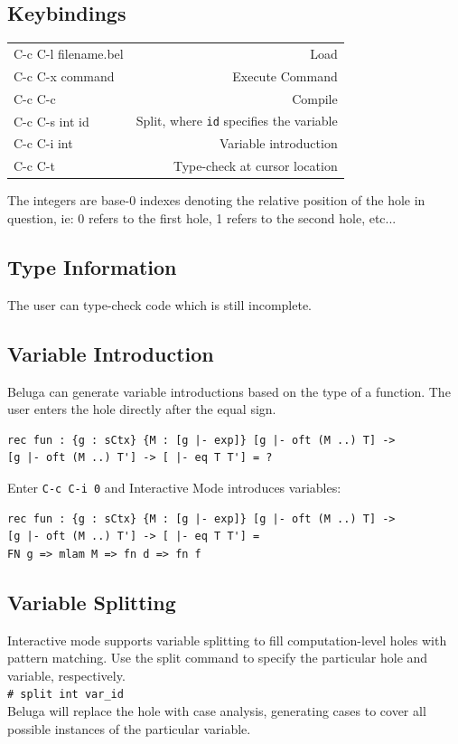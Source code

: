 \documentclass[11pt]{article}
\newcommand{\shellcmd}[1]{\\\indent\texttt{\# #1}\\}
\begin{document}
\subsection{Keybindings}

\begin{tabular}{ l r }
C-c C-l filename.bel & Load \\
C-c C-x command & Execute Command \\
C-c C-c & Compile \\
C-c C-s int id & Split, where \texttt{id} specifies the variable \\
C-c C-i int & Variable introduction \\
C-c C-t & Type-check at cursor location \\
\end{tabular}

The integers are base-0 indexes denoting the relative position of the hole in question, ie: 0 refers to the first hole, 1 refers to the second hole, etc... 
\subsection{Type Information}
The user can type-check code which is still incomplete. 

\subsection{Variable Introduction}
Beluga can generate variable introductions based on the type of a function. The user enters the hole directly after the equal sign. 
\begin{verbatim}
rec fun : {g : sCtx} {M : [g |- exp]} [g |- oft (M ..) T] -> 
[g |- oft (M ..) T'] -> [ |- eq T T'] = ?
\end{verbatim}

Enter \texttt{C-c C-i 0} and Interactive Mode introduces variables:
\begin{verbatim}
rec fun : {g : sCtx} {M : [g |- exp]} [g |- oft (M ..) T] -> 
[g |- oft (M ..) T'] -> [ |- eq T T'] =
FN g => mlam M => fn d => fn f
\end{verbatim}


\subsection{Variable Splitting}
Interactive mode supports variable splitting to fill computation-level holes with pattern matching. Use the split command to specify the particular hole and variable, respectively.
\shellcmd{split int var\_id}
 Beluga will replace the hole with case analysis, generating cases to cover all possible instances of the particular variable. 
\end{document}
